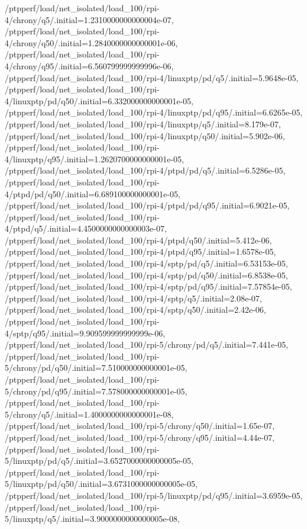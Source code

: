 {    /ptpperf/load/net_isolated/load_100/rpi-4/chrony/q5/.initial=1.2310000000000004e-07,
    /ptpperf/load/net_isolated/load_100/rpi-4/chrony/q50/.initial=1.2840000000000001e-06,
    /ptpperf/load/net_isolated/load_100/rpi-4/chrony/q95/.initial=6.560799999999996e-06,
    /ptpperf/load/net_isolated/load_100/rpi-4/linuxptp/pd/q5/.initial=5.9648e-05,
    /ptpperf/load/net_isolated/load_100/rpi-4/linuxptp/pd/q50/.initial=6.332000000000001e-05,
    /ptpperf/load/net_isolated/load_100/rpi-4/linuxptp/pd/q95/.initial=6.6265e-05,
    /ptpperf/load/net_isolated/load_100/rpi-4/linuxptp/q5/.initial=8.179e-07,
    /ptpperf/load/net_isolated/load_100/rpi-4/linuxptp/q50/.initial=5.902e-06,
    /ptpperf/load/net_isolated/load_100/rpi-4/linuxptp/q95/.initial=1.2620700000000001e-05,
    /ptpperf/load/net_isolated/load_100/rpi-4/ptpd/pd/q5/.initial=6.5286e-05,
    /ptpperf/load/net_isolated/load_100/rpi-4/ptpd/pd/q50/.initial=6.689100000000001e-05,
    /ptpperf/load/net_isolated/load_100/rpi-4/ptpd/pd/q95/.initial=6.9021e-05,
    /ptpperf/load/net_isolated/load_100/rpi-4/ptpd/q5/.initial=4.4500000000000003e-07,
    /ptpperf/load/net_isolated/load_100/rpi-4/ptpd/q50/.initial=5.412e-06,
    /ptpperf/load/net_isolated/load_100/rpi-4/ptpd/q95/.initial=1.6578e-05,
    /ptpperf/load/net_isolated/load_100/rpi-4/sptp/pd/q5/.initial=6.53153e-05,
    /ptpperf/load/net_isolated/load_100/rpi-4/sptp/pd/q50/.initial=6.8538e-05,
    /ptpperf/load/net_isolated/load_100/rpi-4/sptp/pd/q95/.initial=7.57854e-05,
    /ptpperf/load/net_isolated/load_100/rpi-4/sptp/q5/.initial=2.08e-07,
    /ptpperf/load/net_isolated/load_100/rpi-4/sptp/q50/.initial=2.42e-06,
    /ptpperf/load/net_isolated/load_100/rpi-4/sptp/q95/.initial=9.909599999999999e-06,
    /ptpperf/load/net_isolated/load_100/rpi-5/chrony/pd/q5/.initial=7.441e-05,
    /ptpperf/load/net_isolated/load_100/rpi-5/chrony/pd/q50/.initial=7.510000000000001e-05,
    /ptpperf/load/net_isolated/load_100/rpi-5/chrony/pd/q95/.initial=7.578000000000001e-05,
    /ptpperf/load/net_isolated/load_100/rpi-5/chrony/q5/.initial=1.4000000000000001e-08,
    /ptpperf/load/net_isolated/load_100/rpi-5/chrony/q50/.initial=1.65e-07,
    /ptpperf/load/net_isolated/load_100/rpi-5/chrony/q95/.initial=4.44e-07,
    /ptpperf/load/net_isolated/load_100/rpi-5/linuxptp/pd/q5/.initial=3.6527000000000005e-05,
    /ptpperf/load/net_isolated/load_100/rpi-5/linuxptp/pd/q50/.initial=3.6731000000000005e-05,
    /ptpperf/load/net_isolated/load_100/rpi-5/linuxptp/pd/q95/.initial=3.6959e-05,
    /ptpperf/load/net_isolated/load_100/rpi-5/linuxptp/q5/.initial=3.9000000000000005e-08,
}
